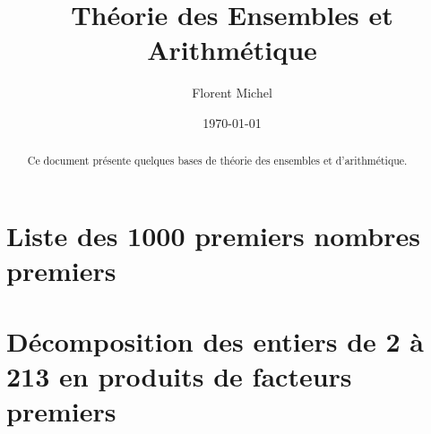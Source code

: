 
\usepackage{splitidx}
\newcommand{\aindex}[1]{#1\index{#1}} %
\makeindex
{}
 
\title{Théorie des Ensembles et Arithmétique}
\date{\today}
\author{%
Florent Michel \\ 
\Fstar} 

\newcommand{\inbox}[1]{\begin{tikzpicture}[baseline=-0.7ex, inner sep=0.5ex] \node[draw] {#1\vphantom{0123456789}}; \end{tikzpicture}}

 
\date{}
\maketitle 
\begin{abstract}
Ce document présente quelques bases de théorie des ensembles et d'arithmétique.
\end{abstract}
\bigskip
\begin{multicols}{2}
\renewcommand{\contentsname}{Table des matières}
\tableofcontents 
\end{multicols}

\clearpage



\clearpage



\clearpage

\appendix



\clearpage

\section{Liste des 1000 premiers nombres premiers} 

\noindent\textsf{}

\clearpage

\section{Décomposition des entiers de 2 à 213 en produits de facteurs premiers}

\begin{multicols}{4}

\end{multicols}

